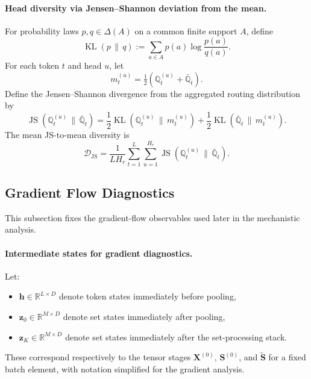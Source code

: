 \documentclass{article}
\theoremstyle{plain}
\theoremstyle{definition}
\theoremstyle{remark}
\begin{document}
\paragraph{Head diversity via Jensen--Shannon deviation from the mean.}
For probability laws $p,q\in\Delta(A)$ on a common finite support $A$, define
\[
\operatorname{KL}(p\,\|\,q)
:=
\sum_{a\in A} p(a)\log\frac{p(a)}{q(a)}.
\]
For each token $t$ and head $u$, let
\[
m_t^{(u)}=\tfrac12\left(\mathbb Q_t^{(u)}+\bar{\mathbb Q}_t\right).
\]
Define the Jensen--Shannon divergence from the aggregated routing distribution by
\begin{equation}
\label{eq:js-divergence}
\operatorname{JS}(\mathbb Q_t^{(u)}\,\|\,\bar{\mathbb Q}_t)
=
\frac{1}{2}\operatorname{KL}(\mathbb Q_t^{(u)}\,\|\,m_t^{(u)})
+
\frac{1}{2}\operatorname{KL}(\bar{\mathbb Q}_t\,\|\,m_t^{(u)}).
\end{equation}
The mean JS-to-mean diversity is
\begin{equation}
\label{eq:js-diversity}
\mathcal D_{\mathrm{JS}}
=
\frac{1}{LH_r}
\sum_{t=1}^L\sum_{u=1}^{H_r}
\operatorname{JS}(\mathbb Q_t^{(u)}\,\|\,\bar{\mathbb Q}_t).
\end{equation}

\subsection{Gradient Flow Diagnostics}
\label{sec:gradient-flow-diagnostics}

This subsection fixes the gradient-flow observables used later in the mechanistic analysis.

\paragraph{Intermediate states for gradient diagnostics.}
Let:
\begin{itemize}
    \item $\mathbf h\in\mathbb R^{L\times D}$ denote token states immediately before pooling,
    \item $\mathbf z_0\in\mathbb R^{M\times D}$ denote set states immediately after pooling,
    \item $\mathbf z_K\in\mathbb R^{M\times D}$ denote set states immediately after the set-processing stack.
\end{itemize}
These correspond respectively to the tensor stages $\mathbf X^{(0)}$, $\mathbf S^{(0)}$, and $\widetilde{\mathbf S}$ for a fixed batch element, with notation simplified for the gradient analysis.
\end{document}
